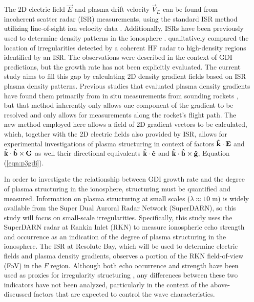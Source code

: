 The 2D electric field \(\vec{E}\)  and plasma drift velocity \(\vec{V}_E\) can be found from incoherent scatter radar (ISR) measurements, using the standard ISR method utilizing line-of-sight ion velocity data \citep{Hei08}.  Additionally, ISRs have been previously used to determine density patterns in the ionosphere \citep{Semeter2009,Dahlgren2012a,Dahlgren2012b}. \citet{Dahlgren2012b} qualitatively compared the location of irregularities detected by a coherent HF radar to high-density regions identified by an ISR.  The observations were described in the context of GDI predictions, but the growth rate has not been explicitly evaluated. The current study aims to fill this gap by calculating 2D density gradient fields based on ISR plasma density patterns. Previous studies that evaluated plasma density gradients have found them primarily from in situ measurements from sounding rockets \citep{Moen2012,Lynch2015}, but that method inherently only allows one component of the gradient to be resolved and only allows for measurements along the rocket's flight path.  The new method employed here allows a field of 2D gradient vectors to be calculated, which, together with the 2D electric fields also provided by ISR, allows for experimental investigations of plasma structuring in context of factors \(\mathbf{\hat{k}}\cdot\mathbf{E}\) and \(\mathbf{\hat{k}}\cdot\mathbf{\hat{b}}\times\mathbf{G}\) as well their directional equivalents \(\mathbf{\hat{k}}\cdot\mathbf{\hat{e}}\) and \(\mathbf{\hat{k}}\cdot\mathbf{\hat{b}}\times\mathbf{\hat{g}}\), Equation (\ref{eqn:p3gdi}).

In order to investigate the relationship between GDI growth rate and the degree of plasma structuring in the ionosphere, structuring must be quantified and measured.  Information on plasma structuring at small scales (\(\lambda \approx 10\) m) is widely available from the Super Dual Auroral Radar Network (SuperDARN), so this study will focus on small-scale irregularities.  Specifically, this study uses the SuperDARN radar at Rankin Inlet (RKN) to measure ionospheric echo strength and occurrence as an indication of the degree of plasma structuring in the ionosphere. The ISR at Resolute Bay, which will be used to determine electric fields and plasma density gradients, observes a portion of the RKN field-of-view (FoV) in the \(F\) region.  Although both echo occurrence and strength have been used as proxies for irregularity structuring \citep[e.g.][]{Milan2002b,Koustov2012}, any differences between these two indicators have not been analyzed, particularly in the context of the above-discussed factors that are expected to control the wave characteristics.

